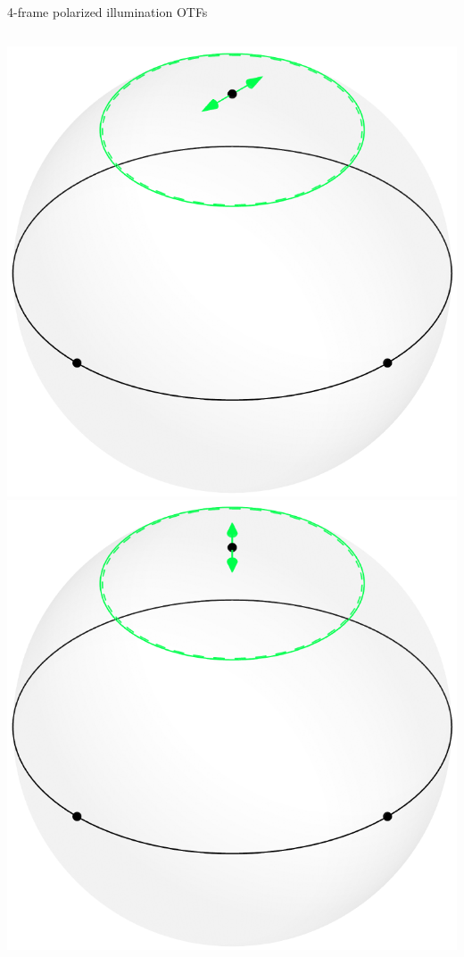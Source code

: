 \documentclass[presentation]{beamer}
\begin{document}
\begin{frame}[label=sec-1]{4-frame polarized illumination OTFs}
  \begin{columns}
    \begin{column}{0.25\textwidth}
      \centering      
      \includegraphics[width=1.0\columnwidth]{pol_illum/scene0.pdf}\\
      \includegraphics[width=1.0\columnwidth]{pol_illum/scene1.pdf}

\end{column}
\end{columns}
\end{frame}
\end{document}

